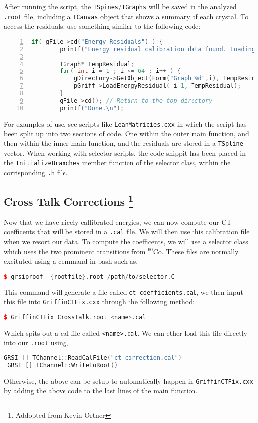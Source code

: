 \documentclass[10pt]{article} %
\begin{document}
After running the script, the \texttt{TSpines}/\texttt{TGraphs} will be saved in the analyzed \texttt{.root} file, including a \texttt{TCanvas} object that shows a summary of each crystal. To access the residuals, use something similar to the following code:
\begin{lstlisting}[language=c++,numbers=left, xleftmargin=5.0ex,caption=Example residual code for loading residuals]
    if( gFile->cd("Energy_Residuals") ) {
        printf("Energy residual calibration data found. Loading...\n");

        TGraph* TempResidual;
        for( int i = 1 ; i <= 64 ; i++ ) {
            gDirectory->GetObject(Form("Graph;%d",i), TempResidual);
            pGriff->LoadEnergyResidual( i-1, TempResidual);
        }
        gFile->cd(); // Return to the top directory
        printf("Done.\n");
\end{lstlisting}

For examples of use, see scripts like \texttt{LeanMatricies.cxx} in which the script has been split up into two sections of code.
One within the outer main function, and then within the inner main function, and the residuals are stored in a \texttt{TSpline} vector.
When working with selector scripts, the code snippit has been placed in the \texttt{InitializeBranches} member function of the selector class, within the corrisponding \texttt{.h} file.

\subsection{Cross Talk Corrections \protect\footnote{Addopted from Kevin Ortner} }

Now that we have nicely callibrated energies, we can now compute our CT coefficents that will be stored in a \texttt{.cal} file.
We will then use this calibration file when we resort our data.
To compute the coefficents, we will use a selector class which uses the two prominent transitions from ${^{60}}$Co.
These files are normally excituted using a command in bash such as,
\begin{lstlisting}[language=c++]
 $ grsiproof  {rootfile}.root /path/to/selector.C
 \end{lstlisting}
This command will generate a file called  \lstinline{ct_coefficients.cal}, we then input this file into \texttt{GriffinCTFix.cxx} through the following method:
\begin{lstlisting}[language=c++]
 $ GriffinCTFix CrossTalk.root <name>.cal
  \end{lstlisting}
Which spits out a cal file called \texttt{<name>.cal}. We can ether load this file directly into our \texttt{.root} using,
\begin{lstlisting}[language=c++]
 GRSI [] TChannel::ReadCalFile("ct_correction.cal")
 GRSI [] TChannel::WriteToRoot()
\end{lstlisting}
Otherwise, the above can be setup to automatically happen in \texttt{GriffinCTFix.cxx} by adding the above code to the last lines of the main function.
\end{document}

